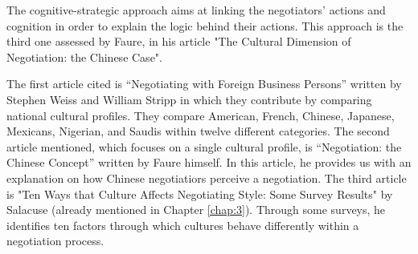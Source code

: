 \documentclass[../main.tex]{subfiles}
\begin{document}
The cognitive-strategic approach aims at linking the negotiators' actions and cognition in order to explain the logic behind their actions. This approach is the third one assessed by Faure, in his article "The Cultural Dimension of Negotiation: the Chinese Case".

The first article cited is “Negotiating with Foreign Business Persons” written by Stephen Weiss and William Stripp in which they contribute by comparing national cultural profiles. They compare American, French, Chinese, Japanese, Mexicans, Nigerian, and Saudis within twelve different categories.
The second article mentioned, which focuses on a single cultural profile, is “Negotiation: the Chinese Concept” written by Faure himself. In this article, he provides us with an explanation on how Chinese negotiatiors perceive a negotiation.
The third article is "Ten Ways that Culture Affects Negotiating Style: Some Survey Results" by Salacuse (already mentioned in Chapter \ref{chap:3}). Through some surveys, he identifies ten factors through which cultures behave differently within a negotiation process. \\
\end{document}
